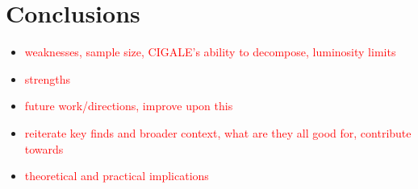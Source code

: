 \chapter{Conclusions}

\begin{itemize}
    \item \textcolor{red}{weaknesses, sample size, CIGALE's ability to decompose, luminosity limits}
    \item \textcolor{red}{strengths}
    \item \textcolor{red}{future work/directions, improve upon this}
    \item \textcolor{red}{reiterate key finds and broader context, what are they all good for, contribute towards}
    \item \textcolor{red}{theoretical and practical implications}
\end{itemize}